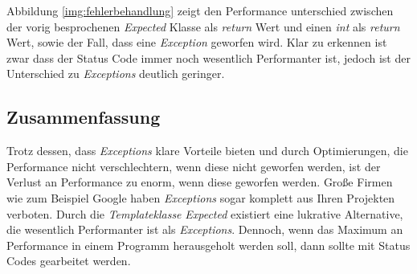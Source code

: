  Abbildung \ref{img:fehlerbehandlung} zeigt den Performance unterschied zwischen der vorig besprochenen \emph{Expected} Klasse als \emph{return} Wert und einen \emph{int} als \emph{return} Wert, sowie der Fall, dass eine \emph{Exception} geworfen wird. Klar zu erkennen ist zwar dass der Status Code immer noch wesentlich Performanter ist, jedoch ist der Unterschied zu \emph{Exceptions} deutlich geringer.
 
\subsection{Zusammenfassung}
Trotz dessen, dass \emph{Exceptions} klare Vorteile bieten und durch Optimierungen, die Performance nicht verschlechtern, wenn diese nicht geworfen werden, ist der Verlust an Performance zu enorm, wenn diese geworfen werden. Große Firmen wie zum Beispiel Google haben \emph{Exceptions} sogar komplett aus Ihren Projekten verboten. Durch die \emph{Templateklasse} \emph{Expected} existiert eine lukrative Alternative, die wesentlich Performanter ist als \emph{Exceptions}. Dennoch, wenn das Maximum an Performance in einem Programm herausgeholt werden soll, dann sollte mit Status Codes gearbeitet werden.